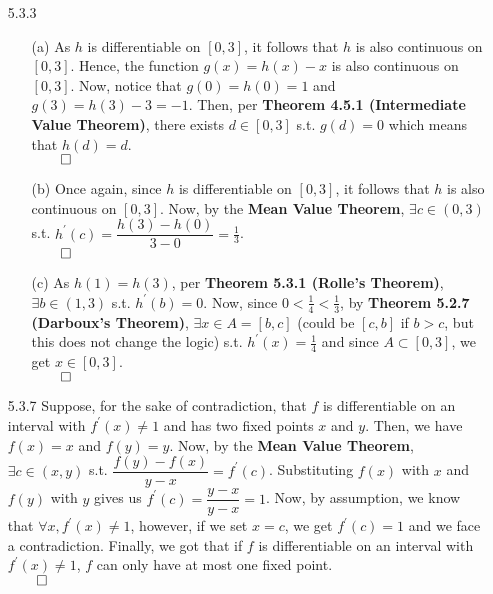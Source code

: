 \documentclass[11pt]{article}
\begin{document}
\begin{itemize}
\begin{itemize}
        \end{itemize}

    \item[5.3.3]
        \begin{itemize}
            \item[(a)]
                As $h$ is differentiable on $[0, 3]$, it follows that $h$ is
                also continuous on $[0, 3]$. Hence, the function $g(x) = h(x) -
                x$ is also continuous on $[0, 3]$. Now, notice that $g(0) =
                h(0) = 1$ and $g(3) = h(3) - 3 = -1$. Then, per \textbf{Theorem
                4.5.1 (Intermediate Value Theorem)}, there exists $d \in [0,
                3]$ s.t. $g(d) = 0$ which means that $h(d) = d$.\\
                $\qed$

            \item[(b)]
                Once again, since $h$ is differentiable on $[0, 3]$, it follows
                that $h$ is also continuous on $[0, 3]$. Now, by the
                \textbf{Mean Value Theorem}, $\exists c \in (0, 3)$ s.t.
                $h^\prime(c) = \dfrac{h(3) - h(0)}{3 - 0} = \frac{1}{3}$.\\
                $\qed$

            \item[(c)]
                As $h(1) = h(3)$, per \textbf{Theorem 5.3.1 (Rolle’s Theorem)},
                $\exists b \in (1, 3)$ s.t. $h^\prime(b) = 0$. Now, since $0 <
                \frac{1}{4} < \frac{1}{3}$, by \textbf{Theorem 5.2.7 (Darboux’s
                Theorem)}, $\exists x \in A = [b, c]$ (could be $[c, b]$ if $b
                > c$, but this does not change the logic) s.t. $h^\prime(x) =
                \frac{1}{4}$ and since $A \subset [0, 3]$, we get $x \in [0,
                3]$.\\
                $\qed$
        \end{itemize}

    \item[5.3.7]
        Suppose, for the sake of contradiction, that $f$ is differentiable on
        an interval with $f^\prime(x) \neq 1$ and has two fixed points $x$ and
        $y$. Then, we have $f(x) = x$ and $f(y) = y$. Now, by the \textbf{Mean
        Value Theorem}, $\exists c \in (x, y)$ s.t. $\dfrac{f(y) - f(x)}{y - x}
        = f^\prime(c)$. Substituting $f(x)$ with $x$ and $f(y)$ with $y$ gives
        us $f^\prime(c) = \dfrac{y - x}{y - x} = 1$. Now, by assumption, we
        know that $\forall x, f^\prime(x) \neq 1$, however, if we set $x = c$,
        we get $f^\prime(c) = 1$ and we face a contradiction. Finally, we got
        that if $f$ is differentiable on an interval with $f^\prime(x) \neq 1$,
        $f$ can only have at most one fixed point.\\
        $\qed$


\end{itemize}
\end{document}
